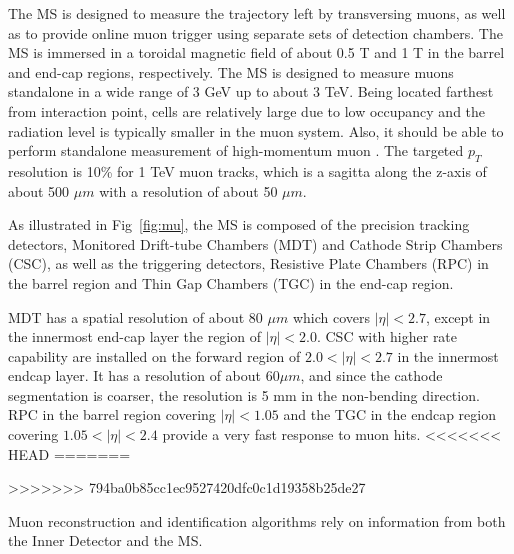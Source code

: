 \par The MS \cite{CERN-LHCC-97-022} is designed to measure the trajectory left by transversing muons, as well as to provide online muon trigger using separate sets of detection chambers. The MS is immersed in a toroidal magnetic field of about 0.5 T and 1 T in the barrel and end-cap regions, respectively. The MS is designed to measure muons standalone in a wide range of 3 GeV up to about 3 TeV. 
Being located farthest from interaction point, cells are relatively large due to low occupancy and the radiation level is typically 
smaller in the muon system. 
Also, it should be able to perform standalone measurement of high-momentum muon \cite{muon}.
The targeted $p_T$ resolution is 10\% for 1 TeV muon tracks, which is a sagitta along the z-axis of about 500 $\mu m$ with a resolution of about 50 $\mu m$.
\par As illustrated in Fig~\ref{fig:mu}, the MS is composed of the precision tracking detectors, Monitored Drift-tube Chambers (MDT) and Cathode Strip Chambers (CSC), as well as the triggering detectors, Resistive Plate Chambers (RPC) in the barrel region and Thin Gap Chambers (TGC) in the end-cap region.
\par MDT has a spatial resolution of about 80 $\mu m$ which covers $|\eta| < 2.7$, except in the innermost end-cap layer the region of $|\eta| < 2.0$. CSC with higher rate capability are installed on the forward region of $2.0 < |\eta| < 2.7$ in the innermost endcap layer. It has a resolution of about 60$\mu m$, and since the cathode segmentation is coarser, the resolution is 5 mm in the non-bending direction.	RPC in the barrel region covering $|\eta| < 1.05$ and the TGC in the endcap region covering $1.05 < |\eta| < 2.4$ provide a very fast response to muon hits.
<<<<<<< HEAD
=======

>>>>>>> 794ba0b85cc1ec9527420dfc0c1d19358b25de27
\par Muon reconstruction and identification algorithms rely on information from both the Inner Detector and the MS.

